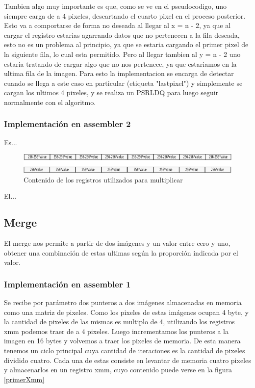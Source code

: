 \documentclass[a4paper]{article}
\begin{document}
Tambien algo muy importante es que, como se ve en el pseudocodigo, uno siempre carga de a 4 pixeles, descartando el cuarto pixel en el proceso posterior. Esto va a comportarse de forma no deseada al llegar al x = n - 2, ya que al cargar el registro estarias agarrando datos que no pertenecen a la fila deseada, esto no es un problema al principio, ya que se estaria cargando el primer pixel de la siguiente fila, lo cual esta permitido. Pero al llegar tambien al y = n - 2 uno estaria tratando de cargar algo que no nos pertenece, ya que estariamos en la ultima fila de la imagen. Para esto la implementacion se encarga de detectar cuando se llega a este caso en particular (etiqueta "lastpixel") y simplemente se cargan los ultimos 4 pixeles, y se realiza un PSRLDQ para luego seguir normalmente con el algoritmo.

\subsubsection{Implementación en assembler 2}

Es...

\begin{figure}[H]
\centering
\includegraphics[scale=0.8]{imagenes/256value.png}
\caption{Contenido de los registros utilizados para multiplicar}
\label{256value}
\end{figure}

El...


\subsection{Merge}

El merge nos permite a partir de dos imágenes y un valor entre cero y uno, obtener una combinación de estas ultimas según la proporción indicada por el valor.

\subsubsection{Implementación en assembler 1}

Se recibe por parámetro dos punteros a dos imágenes almacenadas en memoria como una matriz de pixeles. Como los pixeles de estas imágenes ocupan 4 byte, y la cantidad de pixeles de las mismas es multiplo de 4,  utilizando los registros xmm podemos traer de a 4 pixeles. Luego incrementamos los punteros a la imagen en 16 bytes y volvemos a traer los pixeles de memoria. De esta manera tenemos un ciclo principal cuya cantidad de iteraciones es la cantidad de pixeles dividido cuatro. Cada una de estas consiste en levantar de memoria cuatro pixeles y almacenarlos en un registro xmm, cuyo contenido puede verse en la figura \ref{primerXmm}
\end{document}
